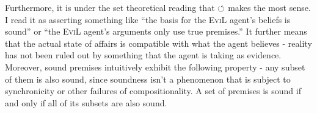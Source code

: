 Furthermore, it is under the set theoretical reading that $\circlearrowleft$ makes
the most sense.  I read it as asserting something like ``the basis for
the \textsc{EviL} agent's beliefs is sound'' or ``the \textsc{EviL}
agent's arguments only use true premises.''  It further means that the
actual state of affairs is compatible with what the agent believes -
reality has not been ruled out by something that the agent is taking
as evidence.  Moreover, sound premises intuitively exhibit the
following property - any subset of them is also sound, since soundness
isn't a phenomenon that is subject to synchronicity or other failures
of compositionality.  A set of premises is sound if and only if all of
its subsets are also sound.


